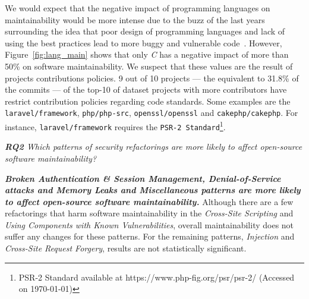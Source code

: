 \documentclass[10pt,conference]{IEEEtran}
\begin{document}
{\begin{itemize}
\end{itemize}


We would expect that the negative impact of programming languages on maintainability
would be more intense due to the buzz of the last years surrounding the idea that
poor design of programming languages and lack of using the best practices lead to
more buggy and vulnerable code~\cite{Ray:2017:LSP:3144574.3126905, 2019arXiv190110220B}.
However, Figure~\ref{fig:lang_main} shows that only \emph{C} has a negative impact of more than 50\% on software maintainability. We suspect that these values are the result of projects
contributions policies. 9 out of 10 projects --- the equivalent to 31.8\% of the commits ---
of the top-10 of dataset projects with more contributors have restrict contribution
policies regarding code standards. Some examples are the \texttt{laravel/framework},
\texttt{php/php-src}, \texttt{openssl/openssl} and
\texttt{cakephp/cakephp}. For instance, \texttt{laravel/framework} requires the
\texttt{PSR-2 Standard}\footnote{PSR-2 Standard available at
https://www.php-fig.org/psr/psr-2/ (Accessed on \today{})}.

\begin{framed}
\textit{\textbf{RQ2} Which patterns of security refactorings are more likely to affect open-source software maintainability?}
\end{framed}

\textbf{\textit{Broken Authentication \& Session Management, Denial-of-Service attacks and Memory Leaks and Miscellaneous patterns are more likely to affect open-source software maintainability.}} Although there are
a few refactorings that harm software maintainability in the \emph{Cross-Site Scripting} and \emph{Using Components with Known Vulnerabilities}, overall maintainability does not suffer any changes for these patterns. For the remaining patterns, \emph{Injection} and \emph{Cross-Site Request Forgery}, results are not statistically significant.


}
\end{document}
